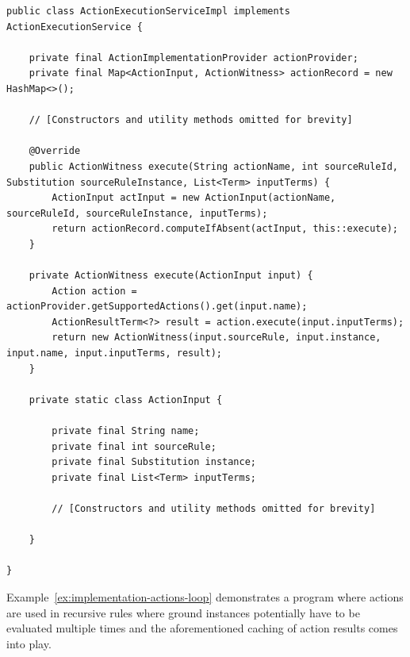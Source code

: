 \begin{lstlisting}[style=java, label={lst:implementation-actions-execution-service}, caption={Alpha's action execution logic}]
public class ActionExecutionServiceImpl implements ActionExecutionService {

	private final ActionImplementationProvider actionProvider;
	private final Map<ActionInput, ActionWitness> actionRecord = new HashMap<>();

	// [Constructors and utility methods omitted for brevity]

	@Override
	public ActionWitness execute(String actionName, int sourceRuleId, Substitution sourceRuleInstance, List<Term> inputTerms) {
		ActionInput actInput = new ActionInput(actionName, sourceRuleId, sourceRuleInstance, inputTerms);
		return actionRecord.computeIfAbsent(actInput, this::execute);
	}

	private ActionWitness execute(ActionInput input) {
		Action action = actionProvider.getSupportedActions().get(input.name);
		ActionResultTerm<?> result = action.execute(input.inputTerms);
		return new ActionWitness(input.sourceRule, input.instance, input.name, input.inputTerms, result);
	}

	private static class ActionInput {

		private final String name;
		private final int sourceRule;
		private final Substitution instance;
		private final List<Term> inputTerms;

        // [Constructors and utility methods omitted for brevity]

	}

}
\end{lstlisting}    

Example~\ref{ex:implementation-actions-loop} demonstrates a program where actions are used in recursive rules where ground instances potentially have to be evaluated multiple times and the aforementioned caching of action results comes into play.

